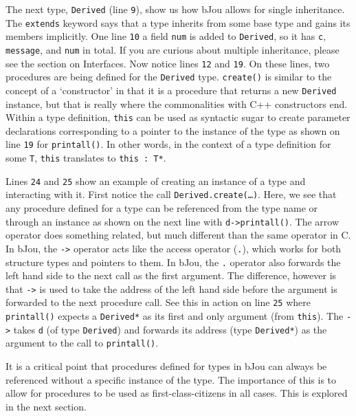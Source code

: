 \documentclass[12pt]{article}
\begin{document}
		The next type, \texttt{Derived} (line \texttt{9}), show us how bJou allows for single inheritance. The \texttt{extends} keyword says that a type inherits from some base type and gains its members implicitly. One line \texttt{10} a field \texttt{num} is added to \texttt{Derived}, so it has \texttt{c}, \texttt{message}, and \texttt{num} in total. If you are curious about multiple inheritance, please see the section on Interfaces. Now notice lines \texttt{12} and \texttt{19}. On these lines, two procedures are being defined for the \texttt{Derived} type. \texttt{create()} is similar to the concept of a `constructor' in that it is a procedure that returns a new \texttt{Derived} instance, but that is really where the commonalities with C++ constructors end. Within a type definition, \texttt{this} can be used as syntactic sugar to create parameter declarations corresponding to a pointer to the instance of the type as shown on line \texttt{19} for \texttt{printall()}. In other words, in the context of a type definition for some \texttt{T}, \texttt{this} translates to \texttt{this : T*}.

		Lines \texttt{24} and \texttt{25} show an example of creating an instance of a type and interacting with it. First notice the call \texttt{Derived.create(\ldots)}. Here, we see that any procedure defined for a type can be referenced from the type name or through an instance as shown on the next line with \texttt{d->printall()}. The arrow operator does something related, but much different than the same operator in C. In bJou, the \texttt{->} operator acts like the access operator (\texttt{.}), which works for both structure types and pointers to them. In bJou, the \texttt{.} operator also forwards the left hand side to the next call as the first argument. The difference, however is that \texttt{->} is used to take the address of the left hand side before the argument is forwarded to the next procedure call. See this in action on line \texttt{25} where \texttt{printall()} expects a \texttt{Derived*} as its first and only argument (from \texttt{this}). The \texttt{->} takes \texttt{d} (of type \texttt{Derived}) and forwards its address (type \texttt{Derived*}) as the argument to the call to \texttt{printall()}.
		
		It is a critical point that procedures defined for types in bJou can always be referenced without a specific instance of the type. The importance of this is to allow for procedures to be used as first-class-citizens in all cases. This is explored in the next section.
\end{document}
